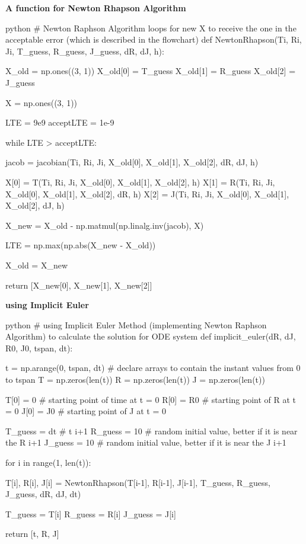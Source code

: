 \documentclass[a4paper]{article}
\begin{document}
\textbf{A function for Newton Rhapson Algorithm}
\begin{code}{python}
# Newton Raphson Algorithm loops for new X to receive the one in the acceptable error (which is described in the flowchart)
def NewtonRhapson(Ti, Ri, Ji, T_guess, R_guess, J_guess, dR, dJ, h):

    X_old = np.ones((3, 1))
    X_old[0] = T_guess
    X_old[1] = R_guess
    X_old[2] = J_guess

    X = np.ones((3, 1))

    LTE = 9e9
    acceptLTE = 1e-9

    while LTE > acceptLTE:

        jacob = jacobian(Ti, Ri, Ji, X_old[0], X_old[1], X_old[2], dR, dJ, h)

        X[0] = T(Ti, Ri, Ji, X_old[0], X_old[1], X_old[2], h)
        X[1] = R(Ti, Ri, Ji, X_old[0], X_old[1], X_old[2], dR, h)
        X[2] = J(Ti, Ri, Ji, X_old[0], X_old[1], X_old[2], dJ, h)

        X_new = X_old - np.matmul(np.linalg.inv(jacob), X)

        LTE = np.max(np.abs(X_new - X_old))

        X_old = X_new

    return [X_new[0], X_new[1], X_new[2]]
\end{code}
\textbf{using Implicit Euler}
\begin{code}{python}
# using Implicit Euler Method (implementing Newton Raphson Algorithm) to calculate the solution for ODE system
def implicit_euler(dR, dJ, R0, J0, tspan, dt):

    t = np.arange(0, tspan, dt)
    # declare arrays to contain the instant values from 0 to tspan
    T = np.zeros(len(t))
    R = np.zeros(len(t))
    J = np.zeros(len(t))

    T[0] = 0  # starting point of time at t = 0
    R[0] = R0 # starting point of R at t = 0
    J[0] = J0 # starting point of J at t = 0

    T_guess = dt  # t i+1
    R_guess = 10  # random initial value, better if it is near the R i+1
    J_guess = 10  # random initial value, better if it is near the J i+1

    for i in range(1, len(t)):

        T[i], R[i], J[i] = NewtonRhapson(T[i-1], R[i-1], J[i-1], T_guess, R_guess, J_guess, dR, dJ, dt)

        T_guess = T[i]
        R_guess = R[i]
        J_guess = J[i]

    return [t, R, J]
\end{code}
\end{document}
